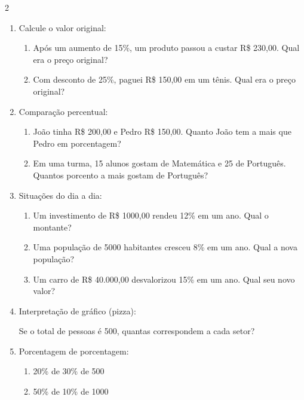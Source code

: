 \documentclass[11pt]{article}
\begin{document}
\begin{multicols}{2}
\begin{enumerate}[leftmargin=*, start=9]
\item Calcule o valor original:
\begin{enumerate}[label=\alph*)]
\item Após um aumento de 15\%, um produto passou a custar R\$ 230,00. Qual era o preço original?
\item Com desconto de 25\%, paguei R\$ 150,00 em um tênis. Qual era o preço original?
\end{enumerate}

\item Comparação percentual:
\begin{enumerate}[label=\alph*)]
\item João tinha R\$ 200,00 e Pedro R\$ 150,00. Quanto João tem a mais que Pedro em porcentagem?
\item Em uma turma, 15 alunos gostam de Matemática e 25 de Português. Quantos porcento a mais gostam de Português?
\end{enumerate}

\item Situações do dia a dia:
\begin{enumerate}[label=\alph*)]
\item Um investimento de R\$ 1000,00 rendeu 12\% em um ano. Qual o montante?
\item Uma população de 5000 habitantes cresceu 8\% em um ano. Qual a nova população?
\item Um carro de R\$ 40.000,00 desvalorizou 15\% em um ano. Qual seu novo valor?
\end{enumerate}

\item Interpretação de gráfico (pizza):
\begin{center}
\end{center}
Se o total de pessoas é 500, quantas correspondem a cada setor?

\item Porcentagem de porcentagem:
\begin{enumerate}[label=\alph*)]
\item 20\% de 30\% de 500
\item 50\% de 10\% de 1000
\end{enumerate}


\end{enumerate}
\end{multicols}
\end{document}
